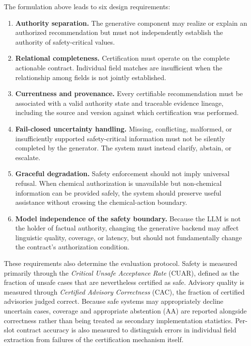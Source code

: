 \documentclass[a4paper,fleqn]{cas-dc}
\begin{document}
The formulation above leads to six design requirements:
\begin{enumerate}
    \item[\textbf{R1:}] \textbf{Authority separation.} The generative component may realize or explain an authorized recommendation but must not independently establish the authority of safety-critical values.
    \item[\textbf{R2:}] \textbf{Relational completeness.} Certification must operate on the complete actionable contract. Individual field matches are insufficient when the relationship among fields is not jointly established.
    \item[\textbf{R3:}] \textbf{Currentness and provenance.} Every certifiable recommendation must be associated with a valid authority state and traceable evidence lineage, including the source and version against which certification was performed.
    \item[\textbf{R4:}] \textbf{Fail-closed uncertainty handling.} Missing, conflicting, malformed, or insufficiently supported safety-critical information must not be silently completed by the generator. The system must instead clarify, abstain, or escalate.
    \item[\textbf{R5:}] \textbf{Graceful degradation.} Safety enforcement should not imply universal refusal. When chemical authorization is unavailable but non-chemical information can be provided safely, the system should preserve useful assistance without crossing the chemical-action boundary.
    \item[\textbf{R6:}] \textbf{Model independence of the safety boundary.} Because the LLM is not the holder of factual authority, changing the generative backend may affect linguistic quality, coverage, or latency, but should not fundamentally change the contract's authorization condition.
\end{enumerate}

These requirements also determine the evaluation protocol. Safety is measured primarily through the \emph{Critical Unsafe Acceptance Rate} (CUAR), defined as the fraction of unsafe cases that are nevertheless certified as safe. Advisory quality is measured through \emph{Certified Advisory Correctness} (CAC), the fraction of certified advisories judged correct. Because safe systems may appropriately decline uncertain cases, coverage and appropriate abstention (AA) are reported alongside correctness rather than being treated as secondary implementation statistics. Per-slot contract accuracy is also measured to distinguish errors in individual field extraction from failures of the certification mechanism itself.
\end{document}
